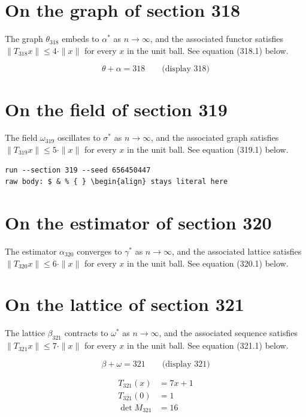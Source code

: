 \documentclass{article}
\begin{document}
\section{On the graph of section 318}
The graph $\theta_{318}$ embeds to $\alpha^{*}$ as $n \to \infty$,
and the associated functor satisfies $\|T_{318} x\| \leq 4 \cdot \|x\|$
for every $x$ in the unit ball. See equation (318.1) below.

$$
\theta + \alpha = 318 \qquad \text{(display 318)}
$$

\section{On the field of section 319}
The field $\omega_{319}$ oscillates to $\sigma^{*}$ as $n \to \infty$,
and the associated graph satisfies $\|T_{319} x\| \leq 5 \cdot \|x\|$
for every $x$ in the unit ball. See equation (319.1) below.

\begin{verbatim}
run --section 319 --seed 656450447
raw body: $ & % { } \begin{align} stays literal here
\end{verbatim}

\section{On the estimator of section 320}
The estimator $\alpha_{320}$ converges to $\gamma^{*}$ as $n \to \infty$,
and the associated lattice satisfies $\|T_{320} x\| \leq 6 \cdot \|x\|$
for every $x$ in the unit ball. See equation (320.1) below.

\section{On the lattice of section 321}
The lattice $\beta_{321}$ contracts to $\omega^{*}$ as $n \to \infty$,
and the associated sequence satisfies $\|T_{321} x\| \leq 7 \cdot \|x\|$
for every $x$ in the unit ball. See equation (321.1) below.

$$
\beta + \omega = 321 \qquad \text{(display 321)}
$$

\begin{align}
T_{321}(x) &= 7 x + 1 \\
T_{321}(0) &= 1 \\
\det M_{321} &= 16
\end{align}
\end{document}
